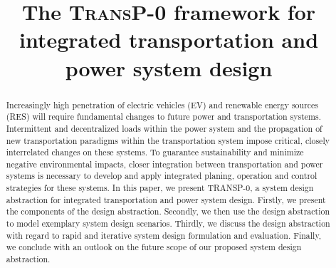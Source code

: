 \title{The \textsc{TransP-0} framework for integrated transportation and power system design}

\author{
	\and
}

\maketitle

\begin{abstract}
	Increasingly high penetration of electric vehicles (EV) and renewable energy sources (RES) will require fundamental changes to future power and transportation systems. Intermittent and decentralized loads within the power system and the propagation of new transportation paradigms within the transportation system impose critical, closely interrelated changes on these systems.
	To guarantee sustainability and minimize negative environmental impacts, closer integration between transportation and power systems is necessary to develop and apply integrated planing, operation and control strategies for these systems. In this paper, we present TRANSP-0, a system design abstraction for integrated transportation and power system design. Firstly, we present the components of the design abstraction. Secondly, we then use the design abstraction to model exemplary system design scenarios. Thirdly, we discuss the design abstraction with regard to rapid and iterative system design formulation and evaluation. Finally, we conclude with an outlook on the future scope of our proposed system design abstraction.
\end{abstract}

